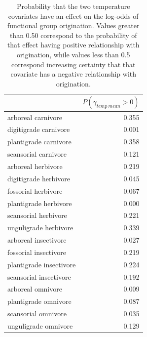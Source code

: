 \documentclass[12pt,letterpaper]{article}
\begin{document}
\begin{table}[ht]
  \centering
  \caption[Posterior probablity of effects of temperature on origination]{Probability that the two temperature covariates have an effect on the log-odds of functional group origination. Values greater than 0.50 correspond to the probability of that effect having positive relationship with origination, while values less than 0.5 correspond increasing certainty that that covariate has a negative relationship with origination.}
  \label{tab:origin_temp}
  \begin{tabular}{ l r }
    \hline
    & \(P(\gamma_{temp\ mean} > 0)\) \\
    \hline
    arboreal carnivore & 0.355 \\ 
    digitigrade carnivore & 0.001 \\ 
    plantigrade carnivore & 0.358 \\ 
    scansorial carnivore & 0.121 \\ 
    arboreal herbivore & 0.219 \\ 
    digitigrade herbivore & 0.045 \\ 
    fossorial herbivore & 0.067 \\ 
    plantigrade herbivore & 0.000 \\ 
    scansorial herbivore & 0.221 \\ 
    unguligrade herbivore & 0.339 \\ 
    arboreal insectivore & 0.027 \\ 
    fossorial insectivore & 0.219 \\ 
    plantigrade insectivore & 0.224 \\ 
    scansorial insectivore & 0.192 \\ 
    arboreal omnivore & 0.009 \\ 
    plantigrade omnivore & 0.087 \\ 
    scansorial omnivore & 0.035 \\ 
    unguligrade omnivore & 0.129 \\ 
    \hline
  \end{tabular}
\end{table}
\end{document}
